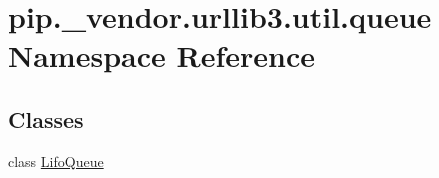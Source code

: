 \hypertarget{namespacepip_1_1__vendor_1_1urllib3_1_1util_1_1queue}{}\section{pip.\+\_\+vendor.\+urllib3.\+util.\+queue Namespace Reference}
\label{namespacepip_1_1__vendor_1_1urllib3_1_1util_1_1queue}
\subsection*{Classes}
\begin{DoxyCompactItemize}
\item 
class \hyperlink{classpip_1_1__vendor_1_1urllib3_1_1util_1_1queue_1_1LifoQueue}{Lifo\+Queue}
\end{DoxyCompactItemize}
